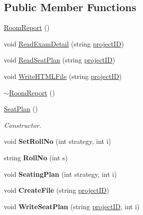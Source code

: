 \subsection*{Public Member Functions}
\begin{DoxyCompactItemize}
\item 
\hyperlink{classSeatPlan_a974a336df39c9fefc2b239a382a4749c}{Room\-Report} ()
\item 
void \hyperlink{classSeatPlan_ae93cefd4fd0401c5d54b8e97b23541ae}{Read\-Exam\-Detail} (string \hyperlink{classReadInput_a3ad470a25b3e0a29466bf4ff1f7d8e81}{project\-I\-D})
\item 
void \hyperlink{classSeatPlan_a618d148beefee9d4db3d038328c9b2c8}{Read\-Seat\-Plan} (string \hyperlink{classReadInput_a3ad470a25b3e0a29466bf4ff1f7d8e81}{project\-I\-D})
\item 
void \hyperlink{classSeatPlan_af572f79142f4dad362f54892c6747214}{Write\-H\-T\-M\-L\-File} (string \hyperlink{classReadInput_a3ad470a25b3e0a29466bf4ff1f7d8e81}{project\-I\-D})
\item 
\hyperlink{classSeatPlan_a446949506a25bcda5eb972c8a4b1384d}{$\sim$\-Room\-Report} ()
\item 
\hyperlink{classSeatPlan_ab1906186f96847704ed71f1a6c738327}{Seat\-Plan} ()
\begin{DoxyCompactList}\small\item\em Constructor. \end{DoxyCompactList}\item 
\hypertarget{classSeatPlan_afa418b9edadff831c73ea6005666becf}{void {\bfseries Set\-Roll\-No} (int strategy, int i)}\label{classSeatPlan_afa418b9edadff831c73ea6005666becf}

\item 
\hypertarget{classSeatPlan_a3dfc44c97eab7f3d33f2023ae0faaa13}{string {\bfseries Roll\-No} (int s)}\label{classSeatPlan_a3dfc44c97eab7f3d33f2023ae0faaa13}

\item 
\hypertarget{classSeatPlan_a1df3b03c983936c07225ed1a79959f1b}{void {\bfseries Seating\-Plan} (int strategy, int i)}\label{classSeatPlan_a1df3b03c983936c07225ed1a79959f1b}

\item 
\hypertarget{classSeatPlan_ade684c0f63b648d4d62df8e7ed800682}{void {\bfseries Create\-File} (string \hyperlink{classReadInput_a3ad470a25b3e0a29466bf4ff1f7d8e81}{project\-I\-D})}\label{classSeatPlan_ade684c0f63b648d4d62df8e7ed800682}

\item 
\hypertarget{classSeatPlan_a3f29cad9d9be46f7bc3055de2ab887fc}{void {\bfseries Write\-Seat\-Plan} (string \hyperlink{classReadInput_a3ad470a25b3e0a29466bf4ff1f7d8e81}{project\-I\-D}, int i)}\label{classSeatPlan_a3f29cad9d9be46f7bc3055de2ab887fc}


\end{DoxyCompactItemize}
